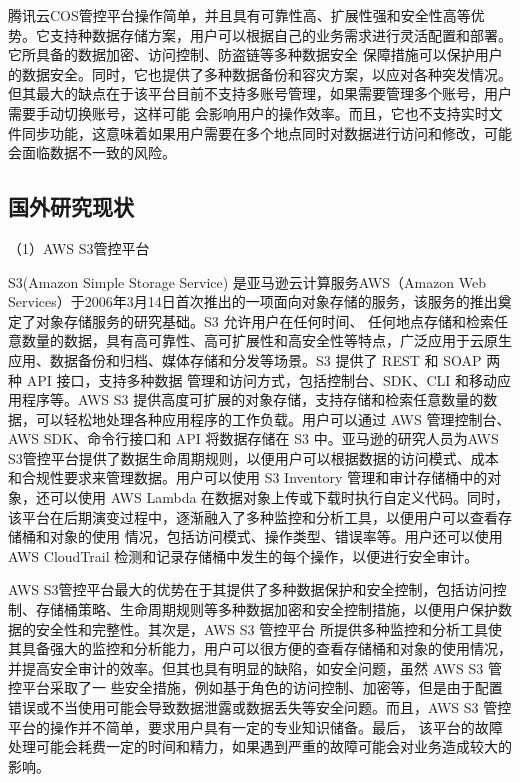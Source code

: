 腾讯云COS管控平台操作简单，并且具有可靠性高、扩展性强和安全性高等优势。它支持种数据存储方案，用户可以根据自己的业务需求进行灵活配置和部署。它所具备的数据加密、访问控制、防盗链等多种数据安全
保障措施可以保护用户的数据安全。同时，它也提供了多种数据备份和容灾方案，以应对各种突发情况。但其最大的缺点在于该平台目前不支持多账号管理，如果需要管理多个账号，用户需要手动切换账号，这样可能
会影响用户的操作效率。而且，它也不支持实时文件同步功能，这意味着如果用户需要在多个地点同时对数据进行访问和修改，可能会面临数据不一致的风险。

\subsection{国外研究现状} 

（1）AWS S3管控平台

S3(Amazon Simple Storage Service) 是亚马逊云计算服务AWS（Amazon Web Services）于2006年3月14日首次推出的一项面向对象存储的服务，该服务的推出奠定了对象存储服务的研究基础。S3 允许用户在任何时间、
任何地点存储和检索任意数量的数据，具有高可靠性、高可扩展性和高安全性等特点，广泛应用于云原生应用、数据备份和归档、媒体存储和分发等场景。S3 提供了 REST 和 SOAP 两种 API 接口，支持多种数据
管理和访问方式，包括控制台、SDK、CLI 和移动应用程序等。AWS S3 提供高度可扩展的对象存储，支持存储和检索任意数量的数据，可以轻松地处理各种应用程序的工作负载。用户可以通过 AWS 管理控制台、
AWS SDK、命令行接口和 API 将数据存储在 S3 中。亚马逊的研究人员为AWS S3管控平台提供了数据生命周期规则，以便用户可以根据数据的访问模式、成本和合规性要求来管理数据。用户可以使用 S3 Inventory 管理和审计存储桶中的对象，还可以使用 AWS Lambda 在数据对象上传或下载时执行自定义代码。同时，该平台在后期演变过程中，逐渐融入了多种监控和分析工具，以便用户可以查看存储桶和对象的使用
情况，包括访问模式、操作类型、错误率等。用户还可以使用 AWS CloudTrail 检测和记录存储桶中发生的每个操作，以便进行安全审计。

AWS S3管控平台最大的优势在于其提供了多种数据保护和安全控制，包括访问控制、存储桶策略、生命周期规则等多种数据加密和安全控制措施，以便用户保护数据的安全性和完整性。其次是，AWS S3 管控平台
所提供多种监控和分析工具使其具备强大的监控和分析能力，用户可以很方便的查看存储桶和对象的使用情况，并提高安全审计的效率。但其也具有明显的缺陷，如安全问题，虽然 AWS S3 管控平台采取了一
些安全措施，例如基于角色的访问控制、加密等，但是由于配置错误或不当使用可能会导致数据泄露或数据丢失等安全问题。而且，AWS S3 管控平台的操作并不简单，要求用户具有一定的专业知识储备。最后，
该平台的故障处理可能会耗费一定的时间和精力，如果遇到严重的故障可能会对业务造成较大的影响。

